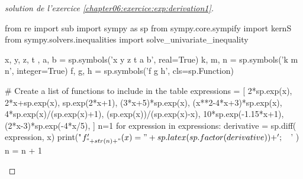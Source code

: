 \documentclass[main.tex]{subfiles}
\begin{document}
%
%
\begin{proof}[solution de l'exercice \ref{chapter06:exercice:exp:derivation1}]  \scriptsize
	\noindent
\begin{pycode}
from re import sub
import sympy as sp
from sympy.core.sympify import kernS
from sympy.solvers.inequalities import solve_univariate_inequality

x, y, z, t , a, b = sp.symbols('x y z t a b', real=True)
k, m, n = sp.symbols('k m n', integer=True)
f, g, h = sp.symbols('f g h', cls=sp.Function)

# Create a list of functions to include in the table
expressions = [
2*sp.exp(x),
2*x+sp.exp(x),
sp.exp(2*x+1),
(3*x+5)*sp.exp(x),
(x**2-4*x+3)*sp.exp(x),
4*sp.exp(x)/(sp.exp(x)+1),
(sp.exp(x))/(sp.exp(x)-x),
10*sp.exp(-1.15*x+1),
(2*x-3)*sp.exp(-4*x/5),
]
n=1
for expression in expressions:
	derivative = sp.diff( expression, x)
	print("$f'_{"+ str(n)+"}(x)=" + sp.latex(sp.factor(  derivative ))  + '; \quad$' )
	n     = n + 1
\end{pycode}
\end{proof}


 
\end{document}
